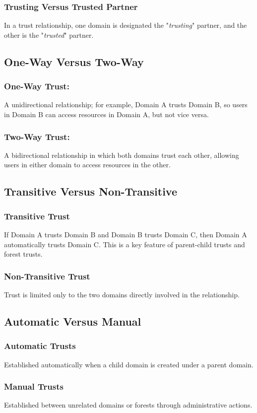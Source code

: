 \subsubsection{Trusting Versus Trusted Partner}
In a trust relationship, one domain is designated the "\textit{trusting}" partner, and the other is the "\textit{trusted}" partner.
\subsection{One-Way Versus Two-Way}
\subsubsection{One-Way Trust:}
A unidirectional relationship; for example, Domain A trusts Domain B, so users in Domain B can access resources in Domain A, but not vice versa.
\subsubsection{Two-Way Trust:}
A bidirectional relationship in which both domains trust each other, allowing users in either domain to access resources in the other.
\subsection{Transitive Versus Non-Transitive}
\subsubsection{Transitive Trust}
If Domain A trusts Domain B and Domain B trusts Domain C, then Domain A automatically trusts Domain C. This is a key feature of parent-child trusts and forest trusts.
\subsubsection{Non-Transitive Trust}
Trust is limited only to the two domains directly involved in the relationship.
\subsection{Automatic Versus Manual}
\subsubsection{Automatic Trusts}
Established automatically when a child domain is created under a parent domain.
\subsubsection{Manual Trusts}
Established between unrelated domains or forests through administrative actions.

